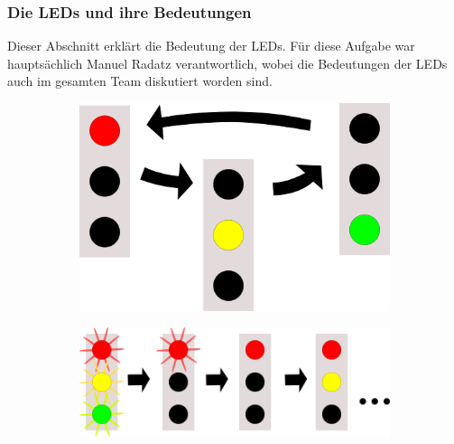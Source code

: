 \subsubsection{Die LEDs und ihre Bedeutungen}
\label{sec:leds}

Dieser Abschnitt erklärt die Bedeutung der LEDs.
Für diese Aufgabe war hauptsächlich Manuel Radatz verantwortlich, wobei die Bedeutungen der LEDs
auch im gesamten Team diskutiert worden sind.

\begin{figure}[h]
  \centering
  \begin{subfigure}[b]{0.22\textwidth}
    \includegraphics[width=\textwidth,keepaspectratio]
                    {./040-komponenten/010-hardware/led-default.png}
    \caption{\label{fig:led-init}}
  \end{subfigure}
  \hspace{0.1\textwidth}
  \begin{subfigure}[b]{0.40\textwidth}
    \includegraphics[width=\textwidth,keepaspectratio]{./040-komponenten/010-hardware/led-start.png}
    \caption{\label{fig:led-start}}
  \end{subfigure}
  

\end{figure}
